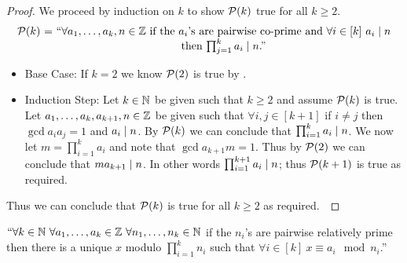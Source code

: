        \begin{proof}
            We proceed by induction on $k$ to show $\mathcal{P}(k)$ true for all $k \ge 2$.
            \[\begin{array}{r@{\ = \ }c}
                \inductive{P}{k} & ``\mbox{$\forall a_1, \dots, a_k, n \in \set{Z}$ if the $a_i$'s are
                                    pairwise co-prime and $\forall i \in [k] \ \divides{a_i}{n}$} \\
                \multicolumn{1}{l}{} & \mbox{then $\divides{\prod_{j = 1}^{k} a_i}{n}$.''}
            \end{array}\]
            \begin{itemize}
                \item
                    Base Case: If $k = 2$ we know $\mathcal{P}(2)$ is true by .
                \item
                    Induction Step: Let $k \in \mathbb{N}$ be given such that $k \ge 2$ and assume
                    $\mathcal{P}(k)$ is true. Let $a_1, \dots, a_k, a_{k + 1}, n \in \mathbb{Z}$ be
                    given such that $\forall i, j \in [k + 1]$ if $i \neq j$ then $\gcd{a_i}{a_j} = 1$
                    and $a_i \mid n$. By $\mathcal{P}(k)$ we can conclude that
                    $\prod_{i = 1}^k a_i \mid n$. We now let $m = \prod_{i = 1}^k a_i$ and note
                    that $\gcd{a_{k + 1}}{m} = 1$. Thus by $\mathcal{P}(2)$ we can conclude that
                    $ma_{k + 1} \mid n$. In other words $\prod_{i = 1}^{k + 1} a_i \mid n$;
                    thus $\mathcal{P}(k + 1)$ is true as required.
            \end{itemize}
            Thus we can conclude that $\mathcal{P}(k)$ is true for all $k \ge 2$ as required.~\QED
        \end{proof}
        \begin{theorem}
            $``\forall k \in \mathbb{N} \ \forall a_1, \dots, a_k \in \mathbb{Z} \
            \forall n_1, \dots, n_k \in \mathbb{N}$ if  the $n_i$'s are pairwise relatively prime
            then there is a unique $x$ modulo $\prod_{i = 1}^{k} n_i$ such that $\forall i \in [k] \ 
            x \equiv a_i \mod n_i$.''
            \label{Chinese Remainder Theorem}
        \end{theorem}
